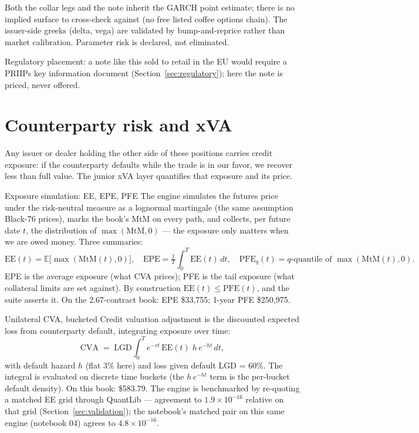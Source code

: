 \documentclass[11pt,a4paper]{article}
\newcommand{\usd}{\$}
\begin{document}
\begin{pitfall}
Both the collar legs and the note inherit the GARCH point estimate; there
is no implied surface to cross-check against (no free listed coffee
options chain). The issuer-side greeks (delta, vega) are validated by
bump-and-reprice rather than market calibration. Parameter risk is
declared, not eliminated.
\end{pitfall}

Regulatory placement: a note like this sold to retail in the EU would
require a PRIIPs key information document
(Section~\ref{sec:regulatory}); here the note is priced, never offered.

\section{Counterparty risk and xVA}
\label{ch:xva}

Any issuer or dealer holding the other side of these positions carries
credit exposure: if the counterparty defaults while the trade is in our
favor, we recover less than full value. The junior xVA layer quantifies
that exposure and its price.

\begin{concept}{Exposure simulation: EE, EPE, PFE}
The engine simulates the futures price under the risk-neutral measure as
a lognormal martingale (the same assumption Black-76 prices), marks the
book's MtM on every path, and collects, per future date $t$, the
distribution of $\max(\text{MtM}, 0)$ --- the exposure only matters when
we are owed money. Three summaries:
\[
  \mathrm{EE}(t) = \mathbb{E}\bigl[\max(\text{MtM}(t),0)\bigr],
  \quad
  \mathrm{EPE} = \tfrac{1}{T}\!\int_0^T \mathrm{EE}(t)\,dt,
  \quad
  \mathrm{PFE}_{q}(t) = q\text{-quantile of } \max(\text{MtM}(t),0).
\]
EPE is the average exposure (what CVA prices); PFE is the tail exposure
(what collateral limits are set against). By construction
$\mathrm{EE}(t) \leq \mathrm{PFE}(t)$, and the suite asserts it.
On the 2.67-contract book: EPE \usd{}33{,}755; 1-year PFE \usd{}250{,}975.
\end{concept}

\begin{concept}{Unilateral CVA, bucketed}
Credit valuation adjustment is the discounted expected loss from
counterparty default, integrating exposure over time:
\[
  \mathrm{CVA} \;=\; \mathrm{LGD}
  \int_0^T e^{-rt}\,\mathrm{EE}(t)\; h\, e^{-ht}\,dt,
\]
with default hazard $h$ (flat 3\% here) and loss given default LGD = 60\%.
The integral is evaluated on discrete time buckets (the $h\,e^{-ht}$
term is the per-bucket default density). On this book: \usd{}583.79. The
engine is benchmarked by re-quoting a matched EE grid through QuantLib
\cite{quantlib} --- agreement to $1.9\times10^{-16}$ relative on that grid
(Section~\ref{sec:validation}); the notebook's matched pair on this same
engine (notebook 04) agrees to $4.8\times10^{-16}$.
\end{concept}
\end{document}
